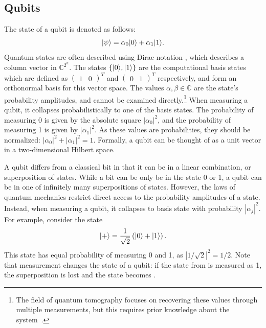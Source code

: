 \subsection{Qubits} \label{sec:quantum-states}
The state of a qubit is denoted as follows:
\begin{equation} \label{eqn:qubit-state}
\vert{\psi}\rangle = \alpha_0\vert{0}\rangle + \alpha_1\vert{1}\rangle.
\end{equation}
Quantum states are often described using Dirac notation \ket{\,\cdotp\,}, which describes a column vector in $\mathbb{C}^{2^n}$.
The states $\{\vert{0}\rangle, \vert{1}\rangle\}$ are the computational basis states which are defined as $(\begin{matrix}1 & 0\end{matrix})^T$ and $(\begin{matrix}0 & 1\end{matrix})^T$ respectively, and form an orthonormal basis for this vector space.
The values $\alpha, \beta \in \mathbb{C}$ are the state's probability amplitudes, and cannot be examined directly.\footnote{The field of quantum tomography focuses on recovering these values through multiple measurements, but this requires prior knowledge about the system~\cite{d2003quantum}.}
When measuring a qubit, it collapses probabilistically to one of the basis states.
The probability of measuring 0 is given by the absolute square $|\alpha_0|^2$, and the probability of measuring 1 is given by $|\alpha_1|^2$.
As these values are probabilities, they should be normalized: $|\alpha_0|^2 + |\alpha_1|^2 = 1$.
Formally, a qubit can be thought of as a unit vector in a two-dimensional Hilbert space.

A qubit differs from a classical bit in that it can be in a linear combination, or superposition of states.
While a bit can be only be in the state 0 or 1, a qubit can be in one of infinitely many superpositions of states.
However, the laws of quantum mechanics restrict direct access to the probability amplitudes of a state.
Instead, when measuring a qubit, it collapses to basis state  with probability $|\alpha_j|^2$.
For example, consider the state
\begin{equation} \label{eqn:plus-state}
\vert{+}\rangle = \dfrac{1}{\sqrt{2}}\left(\vert{0}\rangle + \vert{1}\rangle\right).
\end{equation}
This state has equal probability of measuring 0 and 1, as $|1/\sqrt{2}|^2 = 1/2$.
Note that measurement changes the state of a qubit: if the state from  is measured as 1, the superposition is lost and the state becomes .

